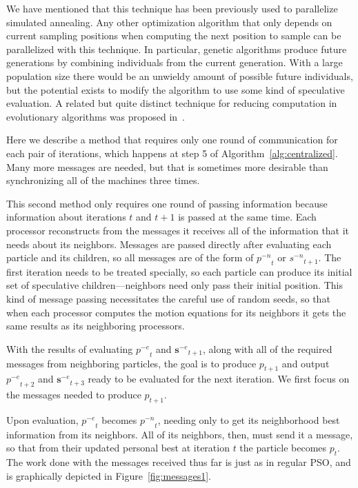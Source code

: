 \documentclass[journal,letterpaper]{IEEEtran}
\newcommand{\fig}[1]{Figure~\ref{fig:#1}}
\newcommand{\alg}[1]{Algorithm~\ref{alg:#1}}
\providecommand{\noeval}[1]{\ensuremath{#1^{-e}}}
\providecommand{\nonbest}[1]{\ensuremath{#1^{-n}}}
\providecommand{\p}{\ensuremath{p}}
\providecommand{\s}{\ensuremath{s}}
\providecommand{\sset}{\ensuremath{\mathbf{s}}}
\begin{document}
We have mentioned that this technique has been previously used to parallelize
simulated annealing.  Any other optimization algorithm that only depends on 
current sampling positions when computing the next position to sample can be
parallelized with this technique.  In particular, genetic algorithms produce
future generations by combining individuals from the current generation.  With
a large population size there would be an unwieldy amount of possible future
individuals, but the potential exists to modify the algorithm to use some kind
of speculative evaluation.  A related but quite distinct technique for reducing
computation in evolutionary algorithms was proposed in~\cite{poli-ai06}.


Here we describe a method that requires only one round of communication for
each pair of iterations, which happens at step 5 of \alg{centralized}.  Many
more messages are needed, but that is sometimes more desirable than
synchronizing all of the machines three times.

This second method only requires one round of passing information because
information about iterations $t$ and $t+1$ is passed at the same time.  Each
processor reconstructs from the messages it receives all of the information
that it needs about its neighbors.  Messages are passed directly after
evaluating each particle and its children, so all messages are of the form of
$\nonbest{\p}_t$ or $\nonbest{\s}_{t+1}$.  The first iteration needs to be
treated specially, so each particle can produce its initial set of speculative
children---neighbors need only pass their initial position.  This kind of
message passing necessitates the careful use of random seeds, so that when each
processor computes the motion equations for its neighbors it gets the same
results as its neighboring processors.

With the results of evaluating $\noeval{\p}_t$ and $\noeval{\sset}_{t+1}$,
along with all of the required messages from neighboring particles, the goal is
to produce $\p_{t+1}$ and output $\noeval{\p}_{t+2}$ and $\noeval{\sset}_{t+3}$
ready to be evaluated for the next iteration.  We first focus on the messages
needed to produce $\p_{t+1}$.

Upon evaluation, $\noeval{\p}_t$ becomes $\nonbest{\p}_t$, needing only to get
its neighborhood best information from its neighbors.  All of its neighbors,
then, must send it a message, so that from their updated personal best at
iteration $t$ the particle becomes $\p_t$.  The work done with the messages
received thus far is just as in regular PSO, and is graphically depicted in 
\fig{messages1}.
\end{document}
